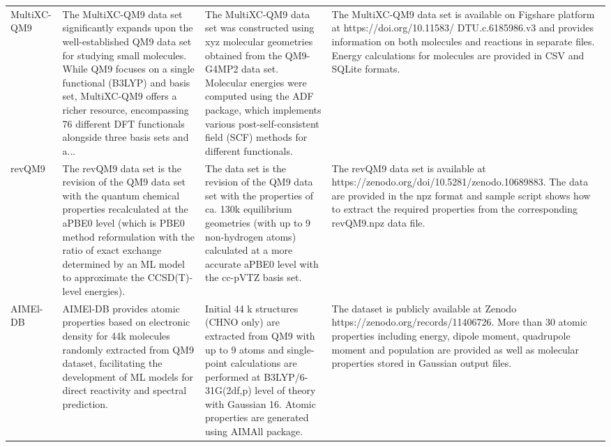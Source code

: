 \documentclass[12pt]{article}
\begin{document}
\begin{longtable}{p{}p{}p{}p{}}
MultiXC-QM9 \cite{ds3-22} & The MultiXC-QM9 data set significantly expands upon the well-established QM9 data set for studying small molecules. While QM9 focuses on a single functional (B3LYP) and basis set, MultiXC-QM9 offers a richer resource, encompassing 76 different DFT functionals alongside three basis sets and a... & The MultiXC-QM9 data set was constructed using xyz molecular geometries obtained from the QM9-G4MP2 data set. Molecular energies were computed using the ADF package, which implements various post-self-consistent field (SCF) methods for different functionals. & The MultiXC-QM9 data set is available on Figshare platform at https://doi.org/10.11583/ DTU.c.6185986.v3 and provides information on both molecules and reactions in separate files. Energy calculations for molecules are provided in CSV and SQLite formats. \cite{ds3-63,ds3-67} \\
revQM9 \cite{ds4-42} & The revQM9 data set is the revision of the QM9 data set with the quantum chemical properties recalculated at the aPBE0 level (which is PBE0 method reformulation with the ratio of exact exchange determined by an ML model to approximate the CCSD(T)-level energies). & The data set is the revision of the QM9 data set with the properties of ca. 130k equilibrium geometries (with up to 9 non-hydrogen atoms) calculated at a more accurate aPBE0 level with the cc-pVTZ basis set. & The revQM9 data set is available at https://zenodo.org/doi/10.5281/zenodo.10689883. The data are provided in the npz format and sample script shows how to extract the required properties from the corresponding revQM9.npz data file. \cite{ds4-71,ds4-72} \\
AIMEl-DB \cite{ds5-5} & AIMEl-DB provides atomic properties based on electronic density for 44k molecules randomly extracted from QM9 dataset, facilitating the development of ML models for direct reactivity and spectral prediction. & Initial 44 k structures (CHNO only) are extracted from QM9 with up to 9 atoms and single-point calculations are performed at B3LYP/6-31G(2df,p) level of theory with Gaussian 16. Atomic properties are generated using AIMAll package. & The dataset is publicly available at Zenodo https://zenodo.org/records/11406726. More than 30 atomic properties including energy, dipole moment, quadrupole moment and population are provided as well as molecular properties stored in Gaussian output files. \cite{ds5-60,ds5-74} \\

\end{longtable}
\end{document}

